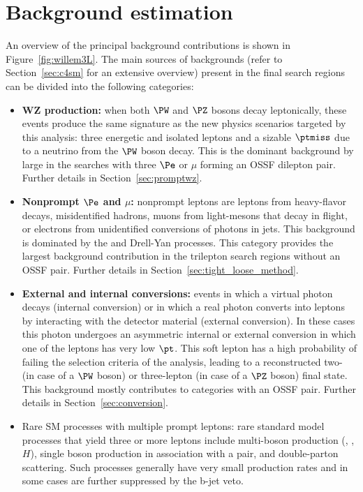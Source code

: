 \section{Background estimation}\label{sec:bgk}
An overview of the principal background contributions is shown in
Figure~\ref{fig:willem3L}.
The main sources of backgrounds (refer to Section~\ref{sec:c4sm} for
an extensive overview) present 
in the final search regions can be divided into the following categories:
\begin{itemize}
\setlength\itemsep{-0.1em}
\item {\bf WZ production:} when both $\PW$ and $\PZ$ bosons decay
  leptonically, these events produce the same signature as the new
  physics scenarios targeted by this analysis: three energetic and
  isolated leptons and a sizable $\ptmiss$ due to a neutrino from the
  $\PW$ boson decay. This is the dominant background by large in the
  searches with three $\Pe$ or $\mu$ forming an OSSF dilepton
  pair. Further details in Section~\ref{sec:promptwz}.

\item {\bf Nonprompt $\Pe$ and $\mu$:} nonprompt leptons are leptons
  from heavy-flavor decays, misidentified hadrons, muons from
  light-mesons that decay in flight, or electrons from unidentified
  conversions of  photons in jets. This background is dominated by the
  \ttbar and Drell-Yan processes. This category provides the largest
  background contribution in the trilepton search regions without an
  OSSF pair. Further details in Section~\ref{sec:tight_loose_method}.

\item {\bf External and internal conversions:} events in which a virtual photon decays (internal conversion) or in which a real photon
converts into leptons by interacting with the detector material
(external conversion). In these cases this photon undergoes an
asymmetric internal or external conversion in which one of the leptons
has very low $\pt$. This soft lepton has a high probability of failing
the selection criteria of the analysis, leading to a reconstructed
two- (in case of a $\PW$ boson) or three-lepton (in case of a $\PZ$
boson) final state. This background mostly contributes to categories
with an OSSF pair. Further details in Section~\ref{sec:conversion}.

\item Rare SM processes with multiple prompt leptons: rare standard
  model processes that yield three or more leptons include multi-boson
  production (\PW, \PZ, $H$), single boson
  production in association with a \ttbar pair, and double-parton
  scattering. Such processes generally have very small production rates
  and in some cases are further suppressed by the b-jet veto. 
\end{itemize}

